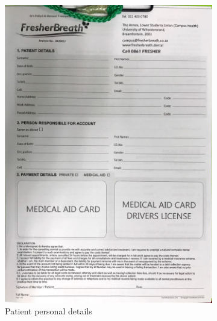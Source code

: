 \documentclass[11 pt]{article}
\begin{document}
\begin{figure}
\clearpage
\centering
\begin{subfigure}{.6\textwidth}
\centering
\includegraphics[width=.95\linewidth, left]{new_patient_paper_form.jpeg}
\caption{Patient personal details}
\label{fig:sub1}
\end{subfigure}%
\begin{subfigure}{.6\textwidth}
\centering

\end{subfigure}
\end{figure}
\end{document}
